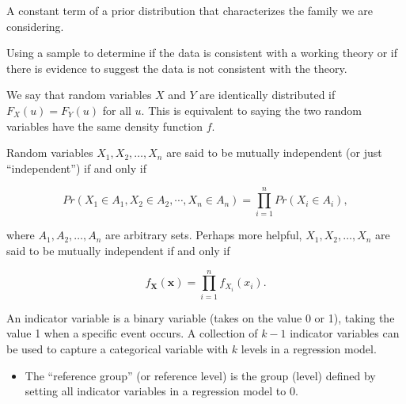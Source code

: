 \documentclass[
  letterpaper,
  DIV=11,
  numbers=noendperiod]{scrreprt}
\providecommand{\tightlist}{%
  \setlength{\itemsep}{0pt}\setlength{\parskip}{0pt}}\usepackage{longtable,booktabs,array}
\theoremstyle{definition}
\theoremstyle{definition}
\theoremstyle{plain}
\theoremstyle{remark}
\begin{document}
\begin{description}
\tightlist
\item[Hyperparameter (Definition~\ref{def-hyperparameter})]
A constant term of a prior distribution that characterizes the family we
are considering.
\item[Hypothesis Testing (Definition~\ref{def-hypothesis-testing})]
Using a sample to determine if the data is consistent with a working
theory or if there is evidence to suggest the data is not consistent
with the theory.
\item[Identically Distributed
(Definition~\ref{def-identically-distributed})]
We say that random variables \(X\) and \(Y\) are identically distributed
if \(F_X(u) = F_Y(u)\) for all \(u\). This is equivalent to saying the
two random variables have the same density function \(f\).
\item[Independence (Definition~\ref{def-independence})]
Random variables \(X_1, X_2, \dotsc, X_n\) are said to be mutually
independent (or just ``independent'') if and only if
\end{description}

\[Pr\left(X_1 \in A_1, X_2 \in A_2, \dotsb, X_n \in A_n\right) = \prod_{i=1}^{n} Pr\left(X_i \in A_i\right),\]

where \(A_1, A_2, \dotsc, A_n\) are arbitrary sets. Perhaps more
helpful, \(X_1, X_2, \dotsc, X_n\) are said to be mutually independent
if and only if

\[f_{\mathbf{X}}(\mathbf{x}) = \prod_{i=1}^{n} f_{X_i}\left(x_i\right).\]

\begin{description}
\tightlist
\item[Indicator Variable (Definition~\ref{def-indicator-variable})]
An indicator variable is a binary variable (takes on the value 0 or 1),
taking the value 1 when a specific event occurs. A collection of \(k-1\)
indicator variables can be used to capture a categorical variable with
\(k\) levels in a regression model.
\end{description}

\begin{itemize}
\tightlist
\item
  The ``reference group'' (or reference level) is the group (level)
  defined by setting all indicator variables in a regression model to 0.
\end{itemize}
\end{document}

